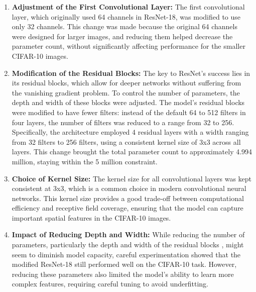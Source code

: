 \documentclass[twoside, 11pt]{article}
\begin{document}
\begin{enumerate}
    \item \textbf{Adjustment of the First Convolutional Layer: } The first convolutional layer, which originally used 64 channels in ResNet-18, was modified to use only 32 channels. This change was made because the original 64 channels were designed for larger images, and reducing them helped decrease the parameter count, without significantly affecting performance for the smaller CIFAR-10 images.
    \item \textbf{Modification of the Residual Blocks: } The key to ResNet’s success lies in its residual blocks, which allow for deeper networks without suffering from the vanishing gradient problem. To control the number of parameters, the depth and width of these blocks were adjusted. The model’s residual blocks were modified to have fewer filters: instead of the default 64 to 512 filters in four layers, the number of filters was reduced to a range from 32 to 256. Specifically, the architecture employed 4 residual layers with a width ranging from 32 filters to 256 filters, using a consistent kernel size of 3x3 across all layers. This change brought the total parameter count to approximately 4.994 million, staying within the 5 million constraint.
    \item \textbf{Choice of Kernel Size:} The kernel size for all convolutional layers was kept consistent at 3x3, which is a common choice in modern convolutional neural networks. This kernel size provides a good trade-off between computational efficiency and receptive field coverage, ensuring that the model can capture important spatial features in the CIFAR-10 images.
    \item \textbf{Impact of Reducing Depth and Width:} While reducing the number of parameters, particularly the depth and width of the residual blocks \cite{zagoruyko2016wide}, might seem to diminish model capacity, careful experimentation showed that the modified ResNet-18 still performed well on the CIFAR-10 task. However, reducing these parameters also limited the model's ability to learn more complex features, requiring careful tuning to avoid underfitting.
\end{enumerate}
\end{document}

